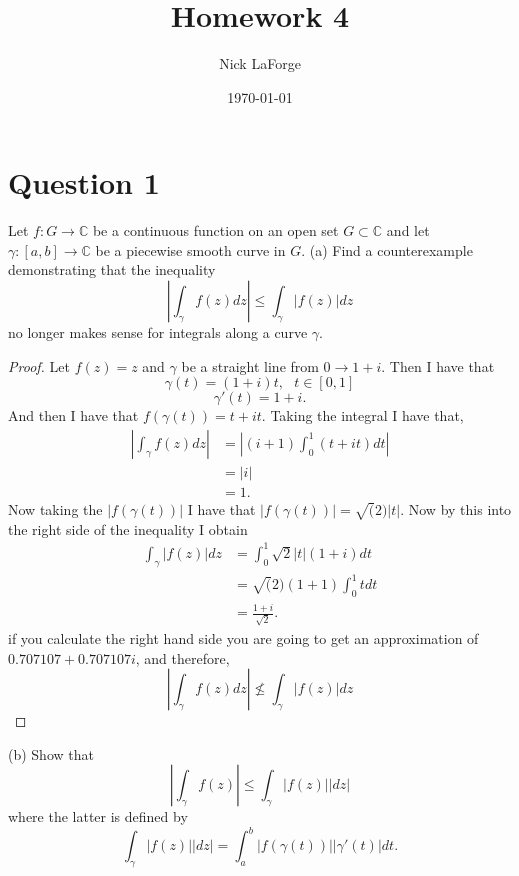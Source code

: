 \documentclass[10pt,two side,openright]{article}
\newcommand{\C}{\mathbb{C}}
\newcommand{\8}{\bar}
\newcommand{\f}{\frac}
\begin{document}
 
\title{Homework 4}
\author{Nick LaForge}
\date{\today}
\maketitle 

\section{Question 1}
Let $f: G \to \C$ be a continuous function on an open set $G \subset \C$ and let $\gamma: [a,b] \to \C$ be a piecewise smooth curve in $G$. \newline \newline
(a) Find a counterexample demonstrating that the inequality 
\[ \left| \int_{\gamma} f(z) dz \right| \leq \int_{\gamma} | f(z)| dz \] 
no longer makes sense for integrals along a curve $\gamma$.  
\begin{proof}
Let $f(z) = z$ and $\gamma$ be a straight line from $0 \to 1+i$. Then I have that 
\[ \gamma(t) = (1+i)t, \ \ \ t \in [0,1] \] 
\[ \gamma'(t) = 1 + i. \] 
And then I have that $f(\gamma(t)) = t+it.$ Taking the integral I have that, 
\begin{align*}
\left| \int_{\gamma} f(z) dz \right| &= \left| (i+1) \int_{0}^{1} (t+ it) dt \right| \\
						 &= |i| \\
						 &= 1. 
\end{align*}
Now taking the $|f(\gamma(t))|$ I have that $|f(\gamma(t))| = \sqrt(2)|t|$. Now by this into the right side of the inequality I obtain
\begin{align*}
\int_{\gamma}|f(z)| dz &= \int_{0}^{1}\sqrt{2}|t|(1+i) dt \\
				 &=  \sqrt(2)(1+1)\int_{0}^{1} t dt \\
				 &= \f{1+i}{\sqrt{2}}. 
\end{align*} 
if you calculate the right hand side you are going to get an approximation of $0.707107 +0.707107i$, and therefore, 
\[ \left| \int_{\gamma} f(z) dz \right| \not\leq \int_{\gamma} | f(z)| dz \] 
\end{proof}
(b) Show that 
\[ \left| \int_{\gamma}f(z) \right| \leq \int_{\gamma} |f(z)||dz| \] 
where the latter is defined by 
\[ \int_{\gamma}|f(z)||dz| = \int_{a}^{b}|f(\gamma (t))|| \gamma '(t)| dt. \] 
\end{document}
